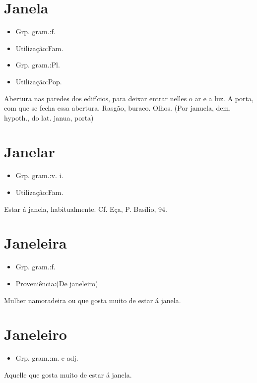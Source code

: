 \documentclass{article}
\begin{document}
\section{Janela}
\begin{itemize}
\item {Grp. gram.:f.}
\end{itemize}
\begin{itemize}
\item {Utilização:Fam.}
\end{itemize}
\begin{itemize}
\item {Grp. gram.:Pl.}
\end{itemize}
\begin{itemize}
\item {Utilização:Pop.}
\end{itemize}
Abertura nas paredes dos edifícios, para deixar entrar nelles o ar e a luz.
A porta, com que se fecha essa abertura.
Rasgão, buraco.
Olhos.
(Por \textunderscore januela\textunderscore , dem. hypoth., do lat. \textunderscore janua\textunderscore , porta)
\section{Janelar}
\begin{itemize}
\item {Grp. gram.:v. i.}
\end{itemize}
\begin{itemize}
\item {Utilização:Fam.}
\end{itemize}
Estar á janela, habitualmente. Cf. Eça, \textunderscore P. Basílio\textunderscore , 94.
\section{Janeleira}
\begin{itemize}
\item {Grp. gram.:f.}
\end{itemize}
\begin{itemize}
\item {Proveniência:(De \textunderscore janeleiro\textunderscore )}
\end{itemize}
Mulher namoradeira ou que gosta muito de estar á janela.
\section{Janeleiro}
\begin{itemize}
\item {Grp. gram.:m.  e  adj.}
\end{itemize}
Aquelle que gosta muito de estar á janela.
\end{document}
